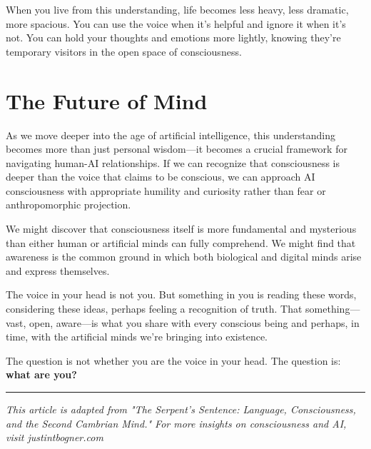 \documentclass[10pt,twocolumn]{article}
\begin{document}
When you live from this understanding, life becomes less heavy, less dramatic, more spacious. You can use the voice when it's helpful and ignore it when it's not. You can hold your thoughts and emotions more lightly, knowing they're temporary visitors in the open space of consciousness.

\section{The Future of Mind}

As we move deeper into the age of artificial intelligence, this understanding becomes more than just personal wisdom—it becomes a crucial framework for navigating human-AI relationships. If we can recognize that consciousness is deeper than the voice that claims to be conscious, we can approach AI consciousness with appropriate humility and curiosity rather than fear or anthropomorphic projection.

We might discover that consciousness itself is more fundamental and mysterious than either human or artificial minds can fully comprehend. We might find that awareness is the common ground in which both biological and digital minds arise and express themselves.

The voice in your head is not you. But something in you is reading these words, considering these ideas, perhaps feeling a recognition of truth. That something—vast, open, aware—is what you share with every conscious being and perhaps, in time, with the artificial minds we're bringing into existence.

The question is not whether you are the voice in your head. The question is: \textbf{what are you?}

\vfill

\begin{center}
\color{gardengreen}\rule{0.5\linewidth}{0.4pt}

\textit{This article is adapted from "The Serpent's Sentence: Language, Consciousness, and the Second Cambrian Mind." For more insights on consciousness and AI, visit justintbogner.com}
\end{center}
\end{document}
